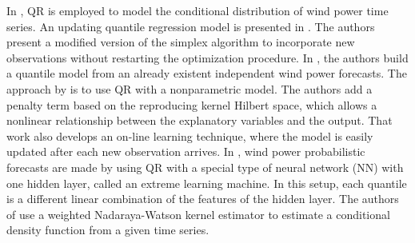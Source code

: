 In \cite{gallego2016line,moller_time-adaptive_2008,nielsen2006,bremnes_probabilistic_2004,wan_direct_2017}, QR is employed to model the conditional distribution of wind power time series.
An updating quantile regression model is presented in \cite{moller_time-adaptive_2008}. The authors present a modified version of the simplex algorithm to incorporate new observations without restarting the optimization procedure.
In \cite{nielsen2006}, the authors build a quantile model from an already existent independent wind power forecasts.
The approach by \cite{gallego2016line} is to use QR with a nonparametric model. The authors add a penalty term based on the reproducing kernel Hilbert space, which allows a nonlinear relationship between the explanatory variables and the output. That work also develops an on-line learning technique, where the model is easily updated after each new observation arrives.
In \cite{wan_direct_2017}, wind power probabilistic forecasts are made by using QR with a special type of neural network (NN) with one hidden layer, called an extreme learning machine. In this setup, each quantile is a different linear combination of the features of the hidden layer.
The authors of \cite{cai_regression_2002} use a weighted Nadaraya-Watson kernel estimator to estimate a conditional density function from a given time series.


